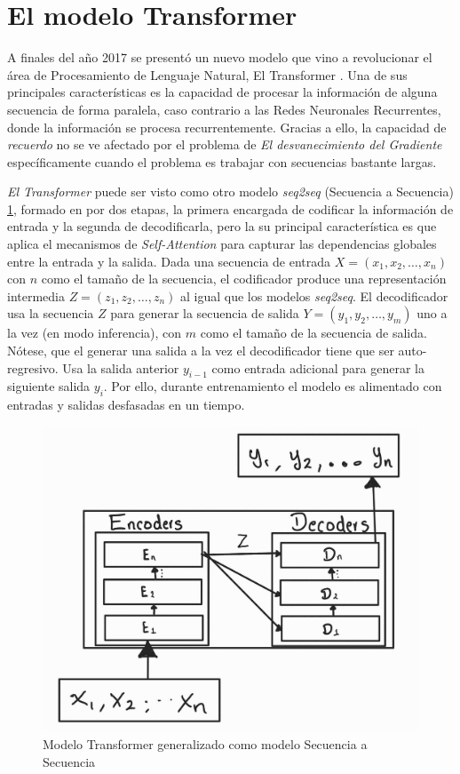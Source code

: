 \section{El modelo Transformer}

A finales del año 2017 se presentó un nuevo modelo que vino a revolucionar el área de Procesamiento
de Lenguaje Natural, El Transformer \cite{Vaswani}. Una de sus principales características es la
capacidad de procesar la información de alguna secuencia de forma paralela, caso contrario a las
Redes Neuronales Recurrentes, donde la información se procesa recurrentemente. Gracias a ello,
la capacidad de \textit{recuerdo} no se ve afectado por el problema de \textit{El desvanecimiento
del Gradiente} específicamente cuando el problema es trabajar con secuencias  bastante largas.

\textit{El Transformer} puede ser visto como otro modelo \textit{seq2seq} (Secuencia a Secuencia)
\ref{fig:trans_seq2sqe}, formado en por dos etapas, la primera encargada de codificar la información de entrada
y la segunda de decodificarla, pero la su principal característica es que aplica el mecanismos de
\textit{Self-Attention} para capturar las dependencias globales entre la entrada y la salida. Dada
una secuencia de entrada $X = (x_1, x_2, \dots, x_n )$ con $n$ como el tamaño de la secuencia,
el codificador produce una representación intermedia
$Z = (z_1, z_2, \dots, z_n)$ al igual que los modelos \textit{seq2seq}. El decodificador usa la
secuencia $Z$ para generar la secuencia de salida
$Y = (y_1, y_2, \dots, y_m)$ uno a la vez (en modo inferencia), con $m$ como el tamaño de la
secuencia de salida. Nótese, que el generar una salida a la vez el decodificador tiene que ser auto-regresivo.
Usa la salida anterior $y_{i-1}$ como entrada adicional para generar la siguiente salida $y_i$. Por
ello, durante entrenamiento el modelo es alimentado con entradas y salidas desfasadas en un tiempo.

\begin{figure}[ht!]
    \centering
    \includegraphics[width=0.4 \textwidth]{Chapters/1. Transformer/Figures/transformer/t_seq2seq.jpg}
    \caption{Modelo Transformer generalizado como modelo Secuencia a Secuencia}
    \label{fig:trans_seq2sqe}
\end{figure}

